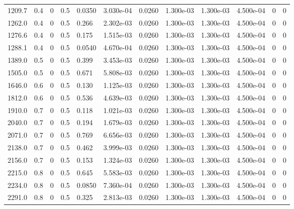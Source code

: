\documentclass[preview]{standalone}
\begin{document}
{{\begin{tabular}{L{1.2cm}C{1.2cm} C{0.3cm}C{0.5cm} C{1.4cm}C{1.4cm} C{1.4cm}C{1.4cm} C{1.6cm}C{1.6cm} C{1.6cm}C{1.6cm}}
  1209.7  &   0.4  & 0     & 0.5 &  0.0350  & 3.030e-04  &  0.0260&   1.300e-03& 1.300e-03 & 4.500e-04   &  0 & 0  \\ 
  1262.0  &   0.4  & 0     & 0.5 &  0.266  & 2.302e-03  &  0.0260&   1.300e-03& 1.300e-03 & 4.500e-04   &  0 & 0  \\ 
  1276.6  &   0.4  & 0     & 0.5 &  0.175  & 1.515e-03  &  0.0260&   1.300e-03& 1.300e-03 & 4.500e-04   &  0 & 0  \\ 
  1288.1  &   0.4  & 0     & 0.5 &  0.0540  & 4.670e-04  &  0.0260&   1.300e-03& 1.300e-03 & 4.500e-04   &  0 & 0  \\ 
  1389.0  &   0.5  & 0     & 0.5 &  0.399  & 3.453e-03  &  0.0260&   1.300e-03& 1.300e-03 & 4.500e-04   &  0 & 0  \\ 
  1505.0  &   0.5  & 0     & 0.5 &  0.671  & 5.808e-03  &  0.0260&   1.300e-03& 1.300e-03 & 4.500e-04   &  0 & 0  \\ 
  1646.0  &   0.6  & 0     & 0.5 &  0.130  & 1.125e-03  &  0.0260&   1.300e-03& 1.300e-03 & 4.500e-04   &  0 & 0  \\ 
  1812.0  &   0.6  & 0     & 0.5 &  0.536  & 4.639e-03  &  0.0260&   1.300e-03& 1.300e-03 & 4.500e-04   &  0 & 0  \\ 
  1910.0  &   0.7  & 0     & 0.5 &  0.118  & 1.021e-03  &  0.0260&   1.300e-03& 1.300e-03 & 4.500e-04   &  0 & 0  \\ 
  2040.0  &   0.7  & 0     & 0.5 &  0.194  & 1.679e-03  &  0.0260&   1.300e-03& 1.300e-03 & 4.500e-04   &  0 & 0  \\ 
  2071.0  &   0.7  & 0     & 0.5 &  0.769  & 6.656e-03  &  0.0260&   1.300e-03& 1.300e-03 & 4.500e-04   &  0 & 0  \\ 
  2138.0  &   0.7  & 0     & 0.5 &  0.462  & 3.999e-03  &  0.0260&   1.300e-03& 1.300e-03 & 4.500e-04   &  0 & 0  \\ 
  2156.0  &   0.7  & 0     & 0.5 &  0.153  & 1.324e-03  &  0.0260&   1.300e-03& 1.300e-03 & 4.500e-04   &  0 & 0  \\ 
  2215.0  &   0.8  & 0     & 0.5 &  0.645  & 5.583e-03  &  0.0260&   1.300e-03& 1.300e-03 & 4.500e-04   &  0 & 0  \\ 
  2234.0  &   0.8  & 0     & 0.5 &  0.0850  & 7.360e-04  &  0.0260&   1.300e-03& 1.300e-03 & 4.500e-04   &  0 & 0  \\ 
  2291.0  &   0.8  & 0     & 0.5 &  0.325  & 2.813e-03  &  0.0260&   1.300e-03& 1.300e-03 & 4.500e-04   &  0 & 0  \\ 
\hline 
\end{tabular} 

}}
\end{document}
